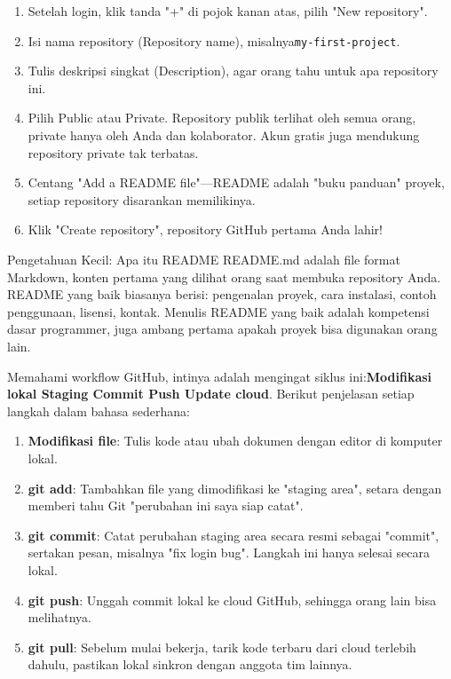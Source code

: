 
\begin{enumerate}
  \item Setelah login, klik tanda "+" di pojok kanan atas, pilih "New repository".
  \item Isi nama repository (Repository name), misalnya\texttt{my-\allowbreak first-\allowbreak project}.
  \item Tulis deskripsi singkat (Description), agar orang tahu untuk apa repository ini.
  \item Pilih Public atau Private. Repository publik terlihat oleh semua orang, private hanya oleh Anda dan kolaborator. Akun gratis juga mendukung repository private tak terbatas.
  \item Centang "Add a README file"—README adalah "buku panduan" proyek, setiap repository disarankan memilikinya.
  \item Klik "Create repository", repository GitHub pertama Anda lahir!
\end{enumerate}

\begin{tcbinfo}{Pengetahuan Kecil: Apa itu README}
README.md adalah file format Markdown, konten pertama yang dilihat orang saat membuka repository Anda. README yang baik biasanya berisi: pengenalan proyek, cara instalasi, contoh penggunaan, lisensi, kontak. Menulis README yang baik adalah kompetensi dasar programmer, juga ambang pertama apakah proyek bisa digunakan orang lain.

\end{tcbinfo}


Memahami workflow GitHub, intinya adalah mengingat siklus ini:\textbf{Modifikasi lokal Staging Commit Push Update cloud}. Berikut penjelasan setiap langkah dalam bahasa sederhana:

\begin{enumerate}
  \item \textbf{Modifikasi file}: Tulis kode atau ubah dokumen dengan editor di komputer lokal.
  \item \textbf{git add}: Tambahkan file yang dimodifikasi ke "staging area", setara dengan memberi tahu Git "perubahan ini saya siap catat".
  \item \textbf{git commit}: Catat perubahan staging area secara resmi sebagai "commit", sertakan pesan, misalnya "fix login bug". Langkah ini hanya selesai secara lokal.
  \item \textbf{git push}: Unggah commit lokal ke cloud GitHub, sehingga orang lain bisa melihatnya.
  \item \textbf{git pull}: Sebelum mulai bekerja, tarik kode terbaru dari cloud terlebih dahulu, pastikan lokal sinkron dengan anggota tim lainnya.
\end{enumerate}

